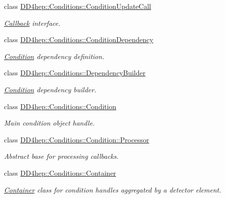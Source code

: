 \begin{DoxyCompactItemize}
class \hyperlink{class_d_d4hep_1_1_conditions_1_1_condition_update_call}{DD4hep::Conditions::ConditionUpdateCall}
\begin{DoxyCompactList}\small\item\em \hyperlink{class_d_d4hep_1_1_callback}{Callback} interface. \item\end{DoxyCompactList}\item 
class \hyperlink{class_d_d4hep_1_1_conditions_1_1_condition_dependency}{DD4hep::Conditions::ConditionDependency}
\begin{DoxyCompactList}\small\item\em \hyperlink{class_d_d4hep_1_1_conditions_1_1_condition}{Condition} dependency definition. \item\end{DoxyCompactList}\item 
class \hyperlink{class_d_d4hep_1_1_conditions_1_1_dependency_builder}{DD4hep::Conditions::DependencyBuilder}
\begin{DoxyCompactList}\small\item\em \hyperlink{class_d_d4hep_1_1_conditions_1_1_condition}{Condition} dependency builder. \item\end{DoxyCompactList}\item 
class \hyperlink{class_d_d4hep_1_1_conditions_1_1_condition}{DD4hep::Conditions::Condition}
\begin{DoxyCompactList}\small\item\em Main condition object handle. \item\end{DoxyCompactList}\item 
class \hyperlink{class_d_d4hep_1_1_conditions_1_1_condition_1_1_processor}{DD4hep::Conditions::Condition::Processor}
\begin{DoxyCompactList}\small\item\em Abstract base for processing callbacks. \item\end{DoxyCompactList}\item 
class \hyperlink{class_d_d4hep_1_1_conditions_1_1_container}{DD4hep::Conditions::Container}
\begin{DoxyCompactList}\small\item\em \hyperlink{class_d_d4hep_1_1_conditions_1_1_container}{Container} class for condition handles aggregated by a detector element. \item\end{DoxyCompactList}\item 

\end{DoxyCompactItemize}
